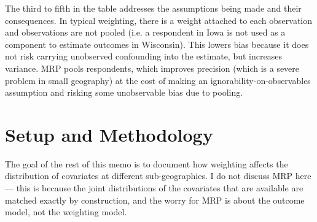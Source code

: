 \documentclass[11pt]{article}
\begin{document}
The third to fifth in the table addresses the assumptions being made and their consequences. In typical weighting, there is a weight attached to each observation and observations are not pooled (i.e. a respondent in Iowa is not used as a component to estimate outcomes in Wisconsin). This lowers bias because it does not risk carrying unobserved confounding into the estimate, but increases variance. MRP pools respondents, which improves precision (which is a severe problem in small geography) at the cost of making an ignorability-on-observables assumption and risking some unobservable bias due to pooling.


\section{Setup and Methodology \label{sec:methods}}

The goal of the rest of this memo is to document how weighting affects the distribution of covariates at different sub-geographies. I do not discuss MRP here --- this is because the joint distributions of the covariates that are available are matched exactly by construction, and the worry for MRP is about the outcome model, not the weighting model.

\end{document}
